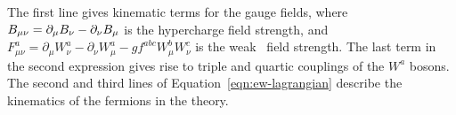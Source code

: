 The first line gives kinematic terms for the gauge fields, where $ B_{\mu\nu} =
\partial_{\mu} B_{\nu} - \partial_{\nu} B_{\mu}$ is the hypercharge field strength,
and  $ F^{a}_{\mu\nu} =
\partial_{\mu} W^{a}_{\nu} - \partial_{\nu} W^{a}_{\mu} - g f^{abc} W^{b}_{\mu}
W^{c}_{\nu}$ is the weak \sutwo\ field strength. The last term in the second
expression gives rise to triple and quartic couplings of the $W^{a}$ bosons. 
The second and third lines of Equation~\ref{eqn:ew-lagrangian} describe the
kinematics of the fermions in the theory. 



